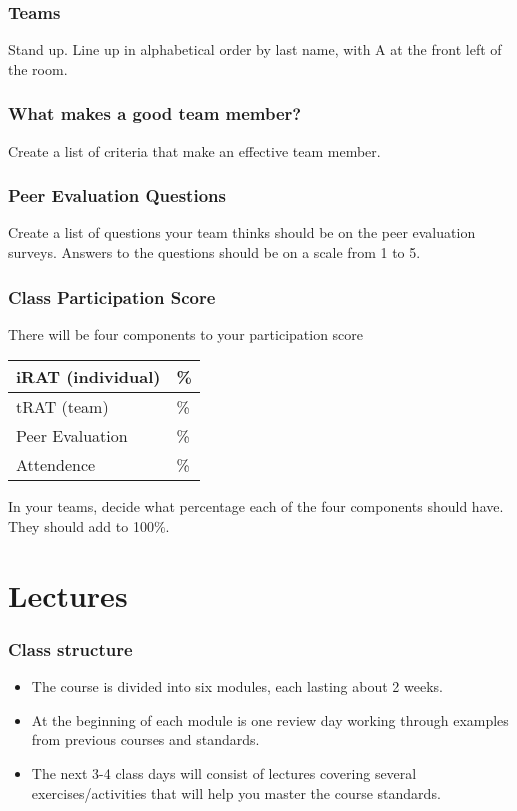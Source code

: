 \documentclass{beamer}
\begin{document}
{  \begin{frame}\frametitle{Teams}
  Stand up.  Line up in alphabetical order by last name, with A at the front left of the room.
  \vspace{4in}
  \end{frame}

  \begin{frame} \frametitle{What makes a good team member?}
  Create a list of criteria that make an effective team member.
  \vspace{4in}
  \end{frame}

  \begin{frame} \frametitle{Peer Evaluation Questions}
  Create a list of questions your team thinks should be on the peer evaluation surveys.  Answers to the questions should be on a scale from 1 to 5.
  \vspace{4in}
  \end{frame}

  \begin{frame} \frametitle{Class Participation Score}
  There will be four components to your participation score

  \begin{center}
  \begin{tabular}{l|l}
  \hline
  iRAT (individual) & \phantom{xxxx}\%   \\ \hline
  tRAT (team) & \phantom{xxxx}\%   \\ \hline
  Peer Evaluation & \phantom{xxxx}\%   \\ \hline
  Attendence & \phantom{xxxx}\%   \\ \hline
  \end{tabular}
  \end{center}


  In your teams, decide what percentage each of the four components should have.  They should add to 100\%.
  \end{frame}
}{
  \section{Lectures}
  \begin{frame} \frametitle{Class structure}
  \begin{itemize}
  \item The course is divided into six modules, each lasting about 2 weeks.
  \item At the beginning of each module is one review day working through
        examples from previous courses and standards.
  \item The next 3-4 class days will consist of lectures covering several
        exercises/activities that will help you master the course standards.
  \end{itemize}
  \end{frame}
}
\end{document}
